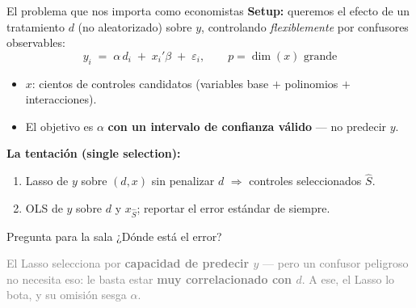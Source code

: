 \documentclass{beamer}
\newcommand{\1}{\mathbb{I}}
\begin{document}
\begin{frame}{El problema que nos importa como economistas}
\small
\textbf{Setup:} queremos el efecto de un tratamiento $d$ (no aleatorizado) sobre $y$, controlando \emph{flexiblemente} por confusores observables:
\[ y_i \;=\; \alpha\, d_i \;+\; x_i'\beta \;+\; \varepsilon_i, \qquad p = \dim(x) \text{ grande} \]
\begin{itemize}\itemsep2pt
  \item $x$: cientos de controles candidatos (variables base $+$ polinomios $+$ interacciones).
  \item El objetivo es $\alpha$ \textbf{con un intervalo de confianza válido} --- no predecir $y$.
\end{itemize}
\pause

\textbf{La tentación (single selection):}
\begin{enumerate}\itemsep2pt
  \item Lasso de $y$ sobre $(d, x)$ sin penalizar $d$ $\Rightarrow$ controles seleccionados $\hat{S}$.
  \item OLS de $y$ sobre $d$ y $x_{\hat{S}}$; reportar el error estándar de siempre.
\end{enumerate}
\pause

\begin{block}{Pregunta para la sala}
¿Dónde está el error?
\end{block}
\pause
\textcolor{gray}{El Lasso selecciona por \textbf{capacidad de predecir $y$} --- pero un confusor peligroso no necesita eso: le basta estar \textbf{muy correlacionado con $d$}. A ese, el Lasso lo bota, y su omisión sesga $\hat{\alpha}$.}
\end{frame}
\end{document}
